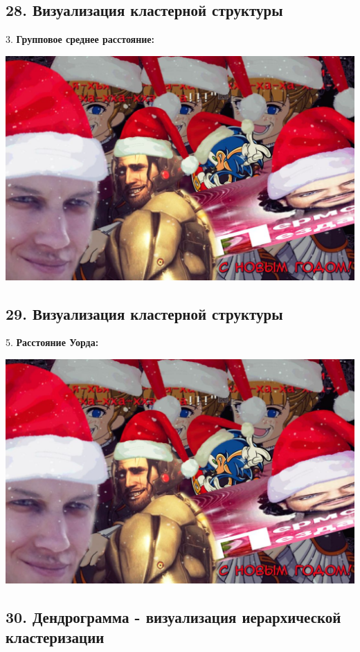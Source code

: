 \subsection{28. Визуализация кластерной структуры}

3. \textbf{Групповое среднее расстояние:}

\includegraphics[scale=0.3]{figures/samplefigure.jpg}

\subsection{29. Визуализация кластерной структуры}

5. \textbf{Расстояние Уорда:}

\includegraphics[scale=0.3]{figures/samplefigure.jpg}

\subsection{30. Дендрограмма - визуализация иерархической кластеризации}

